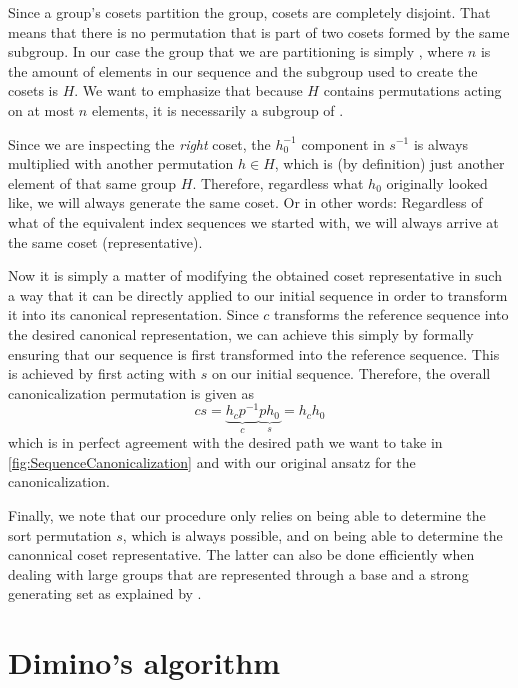 \documentclass[parskip=half]{scrartcl}
\begin{document}
	Since a group's cosets partition the group, cosets are completely disjoint. That means that there is no permutation that is part of two cosets
	formed by the same subgroup. In our case the group that we are partitioning is simply , where $n$ is the amount of elements in our sequence
	and the subgroup used to create the cosets is $H$. We want to emphasize that because $H$ contains permutations acting on at most $n$ elements, it
	is necessarily a subgroup of .

	Since we are inspecting the \emph{right} coset, the $h_0^{-1}$ component in $s^{-1}$ is always multiplied with another permutation $h \in H$,
	which is (by definition) just another element of that same group $H$. Therefore, regardless what $h_0$ originally looked like, we will
	always generate the same coset. Or in other words: Regardless of what of the equivalent index sequences we started with, we will always arrive at
	the same coset (representative).

	Now it is simply a matter of modifying the obtained coset representative in such a way that it can be directly applied to our initial sequence in
	order to transform it into its canonical representation. Since $c$ transforms the reference sequence into the desired canonical representation, we
	can achieve this simply by formally ensuring that our sequence is first transformed into the reference sequence. This is achieved by first acting
	with $s$ on our initial sequence. Therefore, the overall canonicalization permutation is given as
	\begin{equation}
		c s = \underbrace{h_c p^{-1}}_{c} \underbrace{p h_0}_{s} = h_c h_0
	\end{equation}
	which is in perfect agreement with the desired path we want to take in \cref{fig:SequenceCanonicalization} and with our original ansatz for the
	canonicalization.

	Finally, we note that our procedure only relies on being able to determine the sort permutation $s$, which is always possible, and on being able
	to determine the canonnical coset representative. The latter can also be done efficiently when dealing with large groups that are represented
	through a base and a strong generating set as explained by \textcite{Manssur2002a}.


	\appendix

	\section{Dimino's algorithm}
	\label{sec:DiminoAlgorithm}
\end{document}
